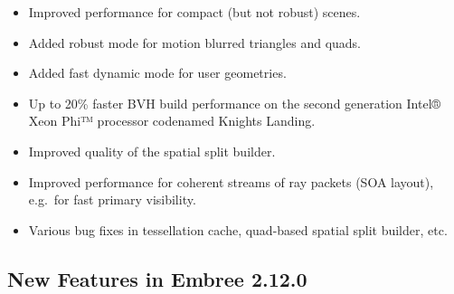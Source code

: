 \begin{itemize}
\tightlist
\item
  Improved performance for compact (but not robust) scenes.
\item
  Added robust mode for motion blurred triangles and quads.
\item
  Added fast dynamic mode for user geometries.
\item
  Up to 20\% faster BVH build performance on the second generation
  Intel® Xeon Phi™ processor codenamed Knights Landing.
\item
  Improved quality of the spatial split builder.
\item
  Improved performance for coherent streams of ray packets (SOA layout),
  e.g.~for fast primary visibility.
\item
  Various bug fixes in tessellation cache, quad-based spatial split
  builder, etc.
\end{itemize}

\subsection{New Features in Embree
2.12.0}\label{new-features-in-embree-2.12.0}

